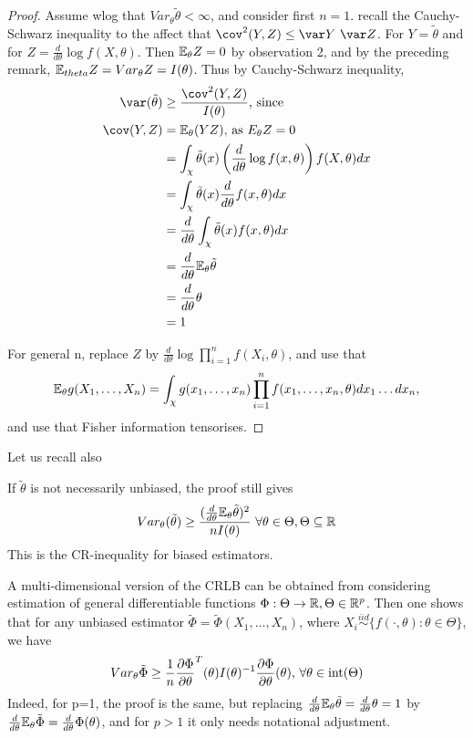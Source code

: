 \documentclass[a4paper]{article}
\begin{document}
\begin{proof}
	Assume wlog  that $Var_{\theta} \tilde{\theta} < \infty$, and consider first $n=1$. recall the Cauchy-Schwarz inequality to the affect that $\cov^2(Y, Z) \le \var Y\text{ } \var Z$. For $Y= \tilde{\theta}$ and for $Z = \frac{d}{d\theta} \log f(X, \theta)$. Then $\mathbb{E}_{\theta} Z = 0$ by observation 2, and by the preceding remark, $\mathbb{E}_{theta} Z = Var_{\theta} Z = I(\theta)$. Thus by Cauchy-Schwarz inequality,
	\begin{align*}
		\var(\tilde{\theta}) &\ge \frac{\cov^2(Y, Z)}{I(\theta)} \text{, since} \\
		\cov(Y,Z) &= \E_{\theta}(YZ) \text{, as } E_{\theta} Z = 0 \\
		&= \int_{\chi} \tilde{\theta} (x) \left( \frac{d}{d\theta} \log f(x,\theta) \right) f(X, \theta) dx \\
		&= \int_{\chi} \tilde{\theta}(x) \frac{d}{d\theta} f(x,\theta) dx \\
		&= \frac{d}{d\theta} \int_{\chi} \tilde{\theta}(x) f(x, \theta) dx \\
		&= \frac{d}{d\theta} \E_{\theta} \tilde{\theta} \\
		&= \frac{d}{d \theta} \theta \\
		&= 1
	\end{align*}

	For general n, replace $Z$ by $\frac{d}{d\theta} \log \prod_{i=1}^{n} f(X_{i}, \theta)$, and use that 
\[
	\mathbb{E}_{\theta} g(X_1, \ldots, X_n) = \int_{\chi} g(x_1, \ldots, x_n) \prod_{i=1}^{n} f(x_1, \ldots, x_n, \theta ) dx_{1} \ldots dx_{n}
,\]
and use that Fisher information tensorises. 
\end{proof}

Let us recall also

\begin{corol}
	If $\tilde{\theta}$ is not necessarily unbiased, the proof still gives
	\[
		Var_{\theta} (\tilde{\theta}) \ge \frac{(\frac{d}{d\theta} \mathbb{E}_{\theta} \tilde{\theta} )^2} {nI(\theta)} \text{ } \forall \theta \in \Theta, \Theta \subseteq \mathbb{R}
	\] This is the CR-inequality for biased estimators. 
\end{corol}

A multi-dimensional version of the CRLB can be obtained from considering estimation of general differentiable functions $\Phi : \Theta \to \mathbb{R}, \Theta \in \mathbb{R}^{p}$. Then one shows that for any unbiased estimator $\tilde{\Phi} = \tilde{\Phi}(X_1, \ldots, X_n)$, where $X_i \stackrel{iid}{\sim} \{f(\cdot , \theta) : \theta \in \Theta\} $, we have
\[
	Var_{\theta} \tilde{\Phi} \ge \frac{1}{n} \frac{\partial\Phi}{\partial\theta}^{T}(\theta)I(\theta)^{-1}\frac{\partial\Phi}{\partial\theta}(\theta) \text{,  } \forall \theta \in\operatorname{int}(\Theta)
\] 
Indeed, for p=1, the proof is the same, but replacing $\frac{d}{d\theta} \mathbb{E}_{\theta} \tilde{\theta} = \frac{d}{d\theta} \theta = 1$ by $\frac{d}{d\theta} \mathbb{E}_{\theta} \tilde{\Phi} = \frac{d}{d\theta} \Phi(\theta)$, and for $p>1$ it only needs notational adjustment.
\end{document}
